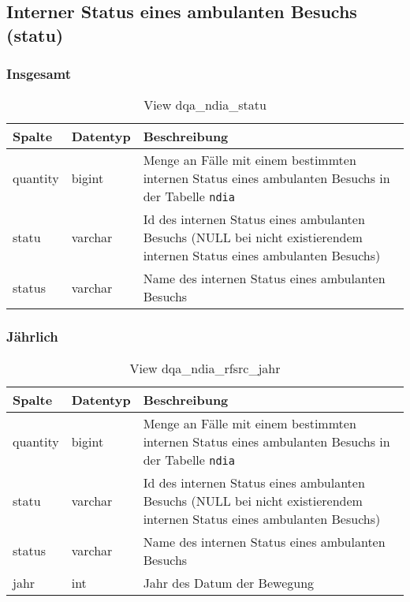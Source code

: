 \subsection{Interner Status eines ambulanten Besuchs (statu)} \label{subsec:bewStatu}

\subsubsection{Insgesamt} \label{subsubsec:bewStatuI}

\begin{table}[ht]
	\centering   
	\caption{View dqa\_ndia\_statu}
	\label{tab:bewStatuI}
	\begin{tabular}{||l|l|p{10cm}||}   		
		\hline
		Spalte & Datentyp & Beschreibung \\ [0.5ex]
		\hline\hline
		quantity & bigint & Menge an Fälle mit einem bestimmten internen Status eines ambulanten Besuchs in der Tabelle \texttt{ndia} \\
		\hline
		statu & varchar & Id des internen Status eines ambulanten Besuchs (NULL bei nicht existierendem internen Status eines ambulanten Besuchs)\\
		\hline
		status & varchar & Name des internen Status eines ambulanten Besuchs \\
		\hline
	\end{tabular}
\end{table}
\newpage
\subsubsection{Jährlich} \label{subsubsec:bewStatuJ}

\begin{table}[ht]
	\centering   
	\caption{View dqa\_ndia\_rfsrc\_jahr}
	\label{tab:bewStatuJ}
	\begin{tabular}{||l|l|p{10cm}||}   		
		\hline
		Spalte & Datentyp & Beschreibung \\ [0.5ex]
		\hline\hline
		quantity & bigint & Menge an Fälle mit einem bestimmten internen Status eines ambulanten Besuchs in der Tabelle \texttt{ndia}\\
		\hline
		statu & varchar & Id des internen Status eines ambulanten Besuchs (NULL bei nicht existierendem internen Status eines ambulanten Besuchs)\\
		\hline
		status & varchar & Name des internen Status eines ambulanten Besuchs \\
		\hline
		jahr & int &  Jahr des Datum der Bewegung \\
		\hline		
	\end{tabular}
\end{table}

